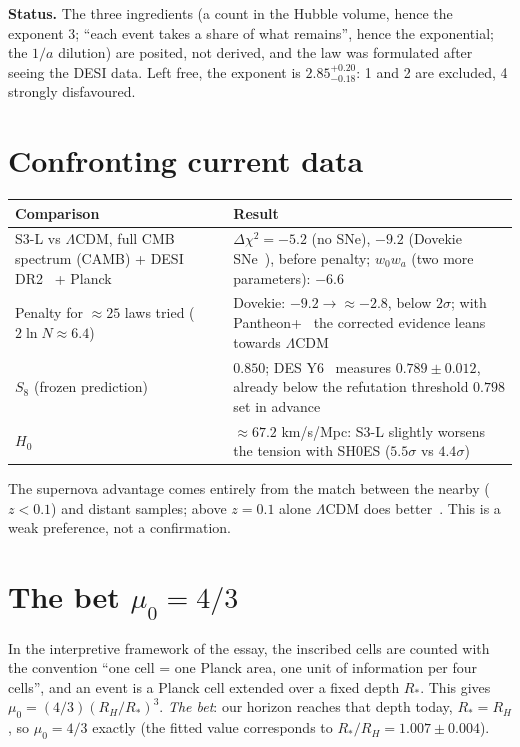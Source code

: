 \documentclass[10pt,a4paper]{article}
\begin{document}
\textbf{Status.} The three ingredients (a count in the Hubble volume, hence the exponent 3; ``each event takes a share of what remains'', hence the exponential; the $1/a$ dilution) are posited, not derived, and the law was formulated after seeing the DESI data. Left free, the exponent is $2.85^{+0.20}_{-0.18}$: 1 and 2 are excluded, 4 strongly disfavoured.

\section{Confronting current data}
\begin{center}\small
\begin{tabular}{@{}L{0.42\textwidth}L{0.52\textwidth}@{}}
\toprule
Comparison & Result \\
\midrule
S3-L vs $\Lambda$CDM, full CMB spectrum (CAMB) + DESI DR2~\cite{desi25} + Planck~\cite{planck18} & $\Delta\chi^2 = -5.2$ (no SNe), $-9.2$ (Dovekie SNe~\cite{dovekie}), before penalty; $w_0w_a$ (two more parameters): $-6.6$ \\
Penalty for $\approx 25$ laws tried ($2\ln N \approx 6.4$) & Dovekie: $-9.2 \to \approx -2.8$, below $2\sigma$; with Pantheon+~\cite{pantheonplus} the corrected evidence leans towards $\Lambda$CDM \\
$S_8$ (frozen prediction) & $0.850$; DES Y6~\cite{desy6} measures $0.789 \pm 0.012$, already below the refutation threshold $0.798$ set in advance \\
$H_0$ & $\approx 67.2$ km/s/Mpc: S3-L slightly worsens the tension with SH0ES ($5.5\sigma$ vs $4.4\sigma$) \\
\bottomrule
\end{tabular}
\end{center}
The supernova advantage comes entirely from the match between the nearby ($z<0.1$) and distant samples; above $z = 0.1$ alone $\Lambda$CDM does better~\cite{efstathiou24}. This is a weak preference, not a confirmation.

\section{The bet $\mu_0 = 4/3$}
In the interpretive framework of the essay, the inscribed cells are counted with the convention ``one cell = one Planck area, one unit of information per four cells'', and an event is a Planck cell extended over a fixed depth $R_*$. This gives $\mu_0 = (4/3)(R_H/R_*)^3$. \emph{The bet}: our horizon reaches that depth today, $R_* = R_H$, so $\mu_0 = 4/3$ exactly (the fitted value corresponds to $R_*/R_H = 1.007 \pm 0.004$).
\end{document}

